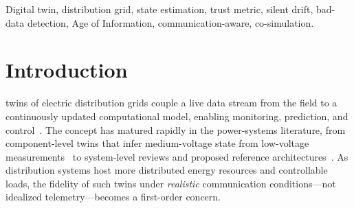 \documentclass[journal]{IEEEtran}
\theoremstyle{plain}
\theoremstyle{definition}
\theoremstyle{remark}
\begin{document}
\begin{abstract}
co-simulation. Pre-campaign diagnostics verify exact numerical reduction
at perfect telemetry, expose a highly anisotropic information geometry
(condition number $4.40\times10^{9}$), and show that matched measurement
sets with identical received fraction and mean age can differ by orders of
magnitude in weakest-direction information. A predeclared 30-seed by
five-bandwidth confirmatory campaign compares the full statistic with an
estimator-matched $\chi^{2}$ baseline and residual-plus-coverage/age
controls at thresholds frozen from calibration-only data.
\end{abstract}

\begin{IEEEkeywords}
Digital twin, distribution grid, state estimation, trust metric, silent
drift, bad-data detection, Age of Information, communication-aware,
co-simulation.
\end{IEEEkeywords}

\section{Introduction}
 twins of electric distribution grids couple a
live data stream from the field to a continuously updated computational
model, enabling monitoring, prediction, and control~\cite{tao2019,
dtgrid2026}. The concept has matured rapidly in the power-systems
literature, from component-level twins that infer medium-voltage state
from low-voltage measurements~\cite{moutis2021} to system-level reviews
and proposed reference architectures~\cite{thwe2025, zomerdijk2024}. As
distribution systems host more distributed energy resources and
controllable loads, the fidelity of such twins under \emph{realistic}
communication conditions---not idealized telemetry---becomes a
first-order concern.
\end{document}
